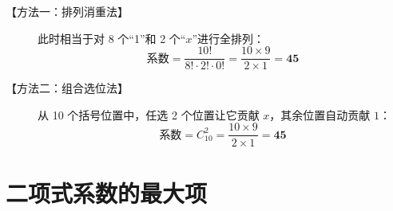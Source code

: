 \documentclass[11pt,a4paper]{article}
\begin{document}
\begin{enumerate}[label=\arabic*., start=8, leftmargin=1.5em]
\begin{description}
        \item[【方法一：排列消重法】] 
        此时相当于对 8 个“1”和 2 个“$x$”进行全排列：\\
        \[ \text{系数} = \frac{10!}{8! \cdot 2! \cdot 0!} = \frac{10 \times 9}{2 \times 1} = \mathbf{45} \]

        \item[【方法二：组合选位法】] 
        从 10 个括号位置中，任选 2 个位置让它贡献 $x$，其余位置自动贡献 $1$：\\
        \[ \text{系数} = C_{10}^2 = \frac{10 \times 9}{2 \times 1} = \mathbf{45} \]
    \end{description}

\end{enumerate}


\newpage

\section{二项式系数的最大项}
\end{document}

